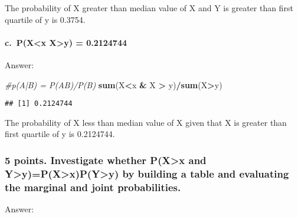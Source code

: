 \documentclass[]{article}
\newenvironment{Shaded}{\begin{snugshade}}{\end{snugshade}}
\newcommand{\CommentTok}[1]{\textcolor[rgb]{0.56,0.35,0.01}{\textit{#1}}}
\newcommand{\KeywordTok}[1]{\textcolor[rgb]{0.13,0.29,0.53}{\textbf{#1}}}
\newcommand{\NormalTok}[1]{#1}
\newcommand{\OperatorTok}[1]{\textcolor[rgb]{0.81,0.36,0.00}{\textbf{#1}}}
\newcommand{\StringTok}[1]{\textcolor[rgb]{0.31,0.60,0.02}{#1}}
\let\oldparagraph\paragraph
\renewcommand{\paragraph}[1]{\oldparagraph{#1}\mbox{}}
\begin{document}
The probability of X greater than median value of X and Y is greater
than first quartile of y is 0.3754.

\hypertarget{c.-pxx-xy-0.2124744}{%
\paragraph{c.~P(X\textless{}x \textbar{} X\textgreater{}y) =
0.2124744}\label{c.-pxx-xy-0.2124744}}

Answer:

\begin{Shaded}
\begin{Highlighting}[]
\CommentTok{#p(A|B) = P(AB)/P(B)}
\KeywordTok{sum}\NormalTok{(X}\OperatorTok{<}\NormalTok{x }\OperatorTok{&}\StringTok{ }\NormalTok{X }\OperatorTok{>}\StringTok{ }\NormalTok{y)}\OperatorTok{/}\KeywordTok{sum}\NormalTok{(X}\OperatorTok{>}\NormalTok{y)}
\end{Highlighting}
\end{Shaded}

\begin{verbatim}
## [1] 0.2124744
\end{verbatim}

The probability of X less than median value of X given that X is greater
than first quartile of y is 0.2124744.

\hypertarget{points.-investigate-whether-pxx-and-yypxxpyy-by-building-a-table-and-evaluating-the-marginal-and-joint-probabilities.}{%
\subsubsection{5 points. Investigate whether P(X\textgreater{}x and
Y\textgreater{}y)=P(X\textgreater{}x)P(Y\textgreater{}y) by building a
table and evaluating the marginal and joint
probabilities.}\label{points.-investigate-whether-pxx-and-yypxxpyy-by-building-a-table-and-evaluating-the-marginal-and-joint-probabilities.}}

Answer:
\end{document}
